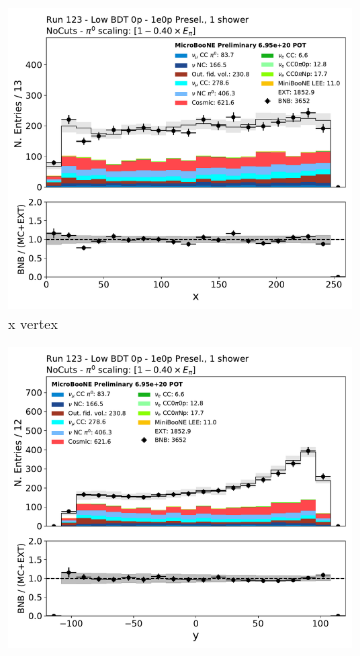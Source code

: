 \begin{figure}[H]
    \centering
    \begin{subfigure}{0.3\textwidth}
    \includegraphics[width=1.0\textwidth]{1e0p/Low_BDT_Sideband/reco_nu_vtx_x.pdf}
    \caption{x vertex}
    \end{subfigure}
    \begin{subfigure}{0.3\textwidth}
    \includegraphics[width=1.0\textwidth]{1e0p/Low_BDT_Sideband/reco_nu_vtx_y.pdf}

\end{subfigure}
\end{figure}
